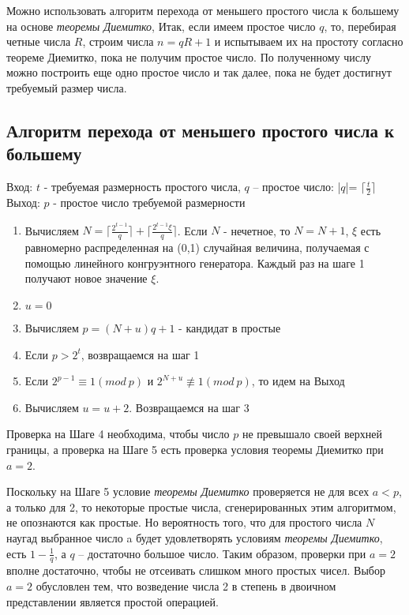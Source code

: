   Можно использовать алгоритм перехода от меньшего простого числа к большему на основе \textit{теоремы Диемитко},
  Итак, если имеем простое число {$q$}, то, перебирая четные числа {$R$}, строим числа {$n = q R + 1$} и испытываем их на 
  простоту согласно теореме Диемитко, пока не получим простое число. По полученному числу можно построить еще одно простое число и так далее,
  пока не будет достигнут требуемый размер числа. 

  
  \subsection{Алгоритм перехода от меньшего простого числа к большему}
    Вход: {$t$} - требуемая размерность простого числа, {$q$} – простое число: |{$q$}|= {$\lceil \frac{t}{2} \rceil$}
    Выход: {$p$} - простое число требуемой размерности
    
      \begin{enumerate}
	\item Вычисляем {$N = \lceil \frac{2^{ t - 1}}{q} \rceil + \lceil \frac{2^{ t - 1} \xi}{q} \rceil$}. 
	Если {$N$} - нечетное, то {$N = N + 1$}, {$\xi$} есть равномерно распределенная на (0,1) случайная величина, получаемая с помощью 
	линейного конгруэнтного генератора. Каждый раз на шаге 1 получают новое значение {$\xi$}.
	\item {$u = 0$}
	\item Вычисляем {$p = (N + u)q + 1$} - кандидат в простые
	\item Если {$p > 2^{ t}$}, возвращаемся на шаг 1
	\item Если {$2^{ p - 1} \equiv 1(mod \: p)$} и {$2^{ N+u} \not\equiv 1(mod \: p)$}, то идем на Выход
	\item Вычисляем {$u = u + 2$}. Возвращаемся на шаг 3
      \end{enumerate}
      
      Проверка на Шаге 4 необходима, чтобы число {$p$} не превышало своей верхней границы, а проверка на Шаге 5 есть проверка условия 
      теоремы Диемитко при {$a=2$}. 
      
      Поскольку на Шаге 5 условие \textit{теоремы Диемитко} проверяется не для всех {$a<p$}, а только для 2, то некоторые простые числа, 
      сгенерированных этим алгоритмом, не опознаются как простые. Но вероятность того, что для простого числа {$N$} наугад выбранное 
      число a будет удовлетворять условиям \textit{теоремы Диемитко}, есть {$1 - \frac{1}{q}$}, а {$q$} – достаточно большое число. Таким образом, проверки
      при {$a=2$} вполне достаточно, чтобы не отсеивать слишком много простых чисел. Выбор {$a=2$} обусловлен тем, что возведение числа 2 
      в степень в двоичном представлении является простой операцией.
      
